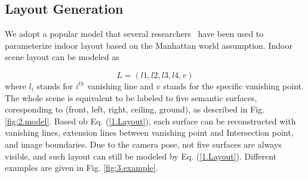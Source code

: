 



\subsection{Layout Generation}
\label{subsection:optimization}
We adopt a popular model that several  researchers~\cite{hedau2009recovering,dasgupta2016delay,ren2016coarse} have been used to parameterize indoor layout based on the Manhattan world assumption. 
Indoor scene layout can be modeled as 

\begin{equation}
	\label{eq:Layout}
	L = (l1, l2, l3, l4, v)
\end{equation}
where $l_{i}$ stands for $i^{th}$ vanishing line and $v$ stands for the specific vanishing point. The whole scene is equivalent to be labeled to five semantic surfaces, coresponding to (front, left, right, ceiling, ground), as described in Fig. \ref{fig:2.model}. Based ob Eq. (\ref{1.Layout}), each surface can be reconstructed with vanishing lines, extension lines between vanishing point and Intersection point, and image boundaries. Due to the camera pose, not five surfaces are always visible, and such layout can still be modeled by Eq. (\ref{1.Layout}). Different examples are given in Fig. \ref{fig:3.example}.